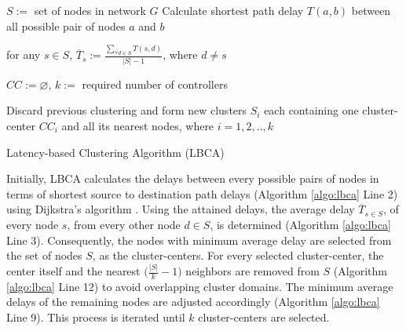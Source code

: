 \documentclass[a4paper,fleqn]{cas-dc}
\begin{document}
\begin{algorithm}
	\SetAlgoLined
	$S :=$ set of nodes in network $G$\;
	Calculate shortest path delay $T(a,b)$ between all possible pair of nodes $a$ and $b$ \;
	
	for any $s\in S$, $\overline{T}_s := \frac{\sum_{\forall d\in S} T(s,d)}{|S|-1}$, where $d \ne s$\;
	
	$CC := \varnothing$, $k :=$ required number of controllers\;
	
	Discard previous clustering and form new clusters $S_i$ each containing one cluster-center $CC_i$ and all its nearest nodes, where $i=1,2,..,k$\;
	
	\caption{Latency-based Clustering Algorithm (LBCA)} \label{algo:lbca}
\end{algorithm}

Initially, LBCA calculates the delays between every possible pairs of nodes in terms of shortest source to destination path delays (Algorithm \ref{algo:lbca} Line 2) using Dijkstra's algorithm \cite{dijkstra1959note}. Using the attained delays, the average delay $\overline{T}_{s\in S}$, of every node $s$, from every other node $d \in S$, is determined (Algorithm \ref{algo:lbca} Line 3). Consequently, the nodes with minimum average delay are selected from the set of nodes $S$, as the cluster-centers. For every selected cluster-center, the center itself and the nearest $\big(\frac{|S|}{k}-1\big)$ neighbors are removed from $S$ (Algorithm \ref{algo:lbca} Line 12) to avoid overlapping cluster domains. The minimum average delays of the remaining nodes are adjusted accordingly (Algorithm \ref{algo:lbca} Line 9). This process is iterated until $k$ cluster-centers are selected.

\end{document}
